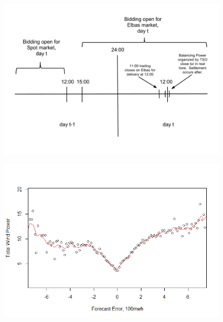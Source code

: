 \documentclass{beamer}
\begin{document}
\begin{frame}[plain]
	\begin{figure}
	\includegraphics[width=1\textwidth]{figures/MarketTiming.png}
	\end{figure}
\end{frame}

\begin{frame}[plain]
	\begin{figure}
	\includegraphics[width=1\textwidth]{figures/windAndForecastError.png}
	\end{figure}
\end{frame}
\end{document}
